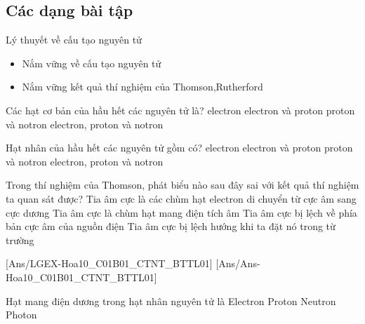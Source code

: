 \subsection{Các dạng bài tập}
\begin{dang}{Lý thuyết về cấu tạo nguyên tử}
	\begin{itemize}
		\item Nắm vững về cấu tạo nguyên tử
		\item Nắm vững kết quả thí nghiệm của Thomson,Rutherford
	\end{itemize}
\end{dang}
\begin{vdex}
	Các hạt cơ bản của hầu hết các nguyên tử là?
	\choice
	{electron}
	{electron và proton}
	{proton và notron}
	{\True electron, proton và notron}
	\loigiai{}
\end{vdex}
\begin{vdex}
	Hạt nhân của hầu hết các nguyên tử gồm có?
	\choice
	{electron}
	{electron và proton}
	{\True proton và notron}
	{electron, proton và notron}
	\loigiai{}
\end{vdex}
\begin{vdex}
	Trong thí nghiệm của Thomson, phát biểu nào sau đây sai với kết quả thí nghiệm ta quan sát được?
	\choice
	{Tia âm cực là các chùm hạt electron di chuyển từ cực âm sang cực dương}
	{Tia âm cực là chùm hạt mang điện tích âm}
	{\True	Tia âm cực bị lệch về phía bản cực âm của nguồn điện}
	{Tia âm cực bị lệch hướng khi ta đặt nó trong từ trường}
	\loigiai{}
\end{vdex}

[Ans/LGEX-Hoa10_C01B01_CTNT_BTTL01]
[Ans/Ans-Hoa10_C01B01_CTNT_BTTL01]
\begin{ex}
	Hạt mang điện dương trong hạt nhân nguyên tử là
	\choice
	{Electron}
	{\True Proton}
	{Neutron}
	{Photon}
\end{ex}

